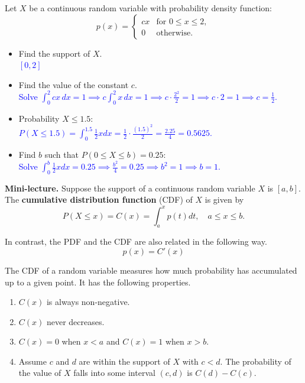 \documentclass[10pt]{article}
\begin{document}
Let $X$ be a continuous random variable with probability density function:
\[
p(x) = 
\begin{cases} 
cx & \text{for } 0 \leq x \leq 2, \\
0 & \text{otherwise}.
\end{cases}
\]
\begin{itemize}
\item[(a)] Find the support of $X$.
%
\\
\underline{{\large
\textcolor{blue}{$[0,2]$}
}}
\vfill

\item[(b)] Find the value of the constant $c$.\\
\textcolor{blue}{Solve $\int_0^2 cx \, dx = 1 \implies c \int_0^2 x \, dx = 1 \implies c \cdot \frac{2^2}{2} = 1 \implies c \cdot 2 = 1 \implies c = \frac{1}{2}$.}

\vfill

\item[(c)] Probability $X \le 1.5$:\\
\textcolor{blue}{$P(X \le 1.5) = \int_0^{1.5} \frac{1}{2} x dx = \frac{1}{2} \cdot \frac{(1.5)^2}{2} = \frac{2.25}{4} = 0.5625.$}

\vfill

\item[(d)] Find $b$ such that $P(0\le X\le b)=0.25$:\\
\textcolor{blue}{Solve $\int_0^b \frac{1}{2}x dx = 0.25 \implies \frac{b^2}{4}=0.25 \implies b^2=1 \implies b=1$.}

\vfill
\end{itemize}

\newpage%


{\bf\color{blue}Mini-lecture.} Suppose the support of a continuous random variable $X$ is $[a, b]$. The {\bf cumulative distribution function} (CDF) of $X$ is given by
{\color{blue}
\[P(X \leq x) = C(x) = \int_a^x p(t) dt, \quad a\le x\le b.\]
}

In contrast, the PDF and the CDF are also related in the following way. \[p(x)=C'(x)\]

The CDF of a random variable measures how much probability has accumulated up to a given point. It has the following properties.
\begin{enumerate}
    \item $C(x)$ is always non-negative.
    \item $C(x)$ never decreases.
    \item $C(x)=0$ when $x<a$ and $C(x)=1$ when $x>b$.
    \item Assume $c$ and $d$ are within the support of $X$ with $c<d$. The probability of the value of $X$ falls into some interval $(c, d)$ is $C(d)-C(c)$.
\end{enumerate}
\end{document}
